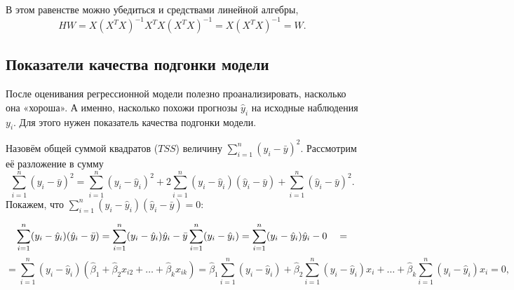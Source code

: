 \documentclass[12pt]{article}
\DeclareMathOperator{\col}{col}
\DeclareMathOperator{\Span}{span}
\newcommand{\hb}{\hat{\beta}}
\newcommand{\hy}{\hat{y}}
\newcommand{\TSS}{TSS}
\begin{document}







В этом равенстве можно убедиться и средствами линейной алгебры,
\[
HW = X(X^TX)^{-1} X^T X(X^TX)^{-1} = X(X^TX)^{-1} = W.
\]

\subsection{Показатели качества подгонки модели}

После оценивания регрессионной модели полезно проанализировать, насколько она «хороша». 
А именно, насколько похожи прогнозы $\hy_i$ на исходные наблюдения $y_i$.
Для этого нужен показатель качества подгонки модели.

Назовём общей суммой квадратов ($\TSS$) величину $\sum_{i=1}^n (y_i - \bar{y})^2$. 
Рассмотрим её разложение в сумму
\[
\sum_{i=1}^n (y_i - \bar{y})^2 = \sum_{i=1}^n (y_i - \hy_i)^2 + 2\sum_{i=1}^n (y_i - \hy_i)(\hy_i - \bar{y}) + \sum_{i=1}^n (\hy_i - \bar{y})^2.
\]
Покажем, что $\sum_{i=1}^n (y_i - \hy_i)(\hy_i - \bar{y}) = 0$:

\[
\sum_{i=1}^n (y_i - \hat{y}_i)(\hat{y}_i - \bar{y}) = \sum_{i=1}^n (y_i - \hat{y}_i)\hat{y}_i - \bar{y}\sum_{i=1}^n (y_i - \hat{y}_i) \\
= \sum_{i=1}^n (y_i - \hat{y}_i)\hat{y}_i - 0 \quad =
\]
\[
= \sum_{i=1}^n (y_i - \hat{y}_i)(\hb_1 + \hb_2 x_{i2}+ \dots + \hb_k x_{ik} )
= \hb_1 \sum_{i=1}^n (y_i - \hat{y}_i) + \hb_2 \sum_{i=1}^n (y_i - \hat{y}_i)x_i + \dots + \hb_k \sum_{i=1}^n (y_i - \hat{y}_i)x_i = 0,
\]
\end{document}
